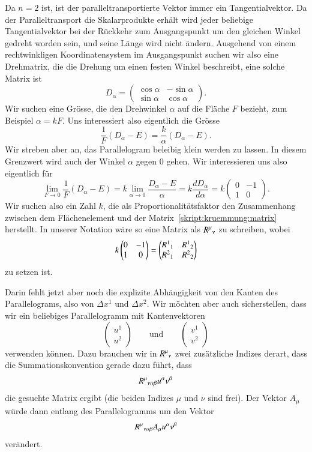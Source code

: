 Da $n=2$ ist, ist der paralleltransportierte Vektor immer ein
Tangentialvektor.
Da der Paralleltransport die Skalarprodukte erhält wird jeder beliebige
Tangentialvektor bei der Rückkehr zum Ausgangspunkt um den gleichen
Winkel gedreht worden sein, und seine Länge wird nicht ändern.
Ausgehend von einem rechtwinkligen Koordinatensystem im Ausgangspunkt
suchen wir also eine Drehmatrix, die die Drehung um einen festen Winkel
beschreibt, eine solche Matrix ist
\[
D_{\alpha}
=
\begin{pmatrix}
\cos\alpha&-\sin\alpha\\
\sin\alpha& \cos\alpha
\end{pmatrix}.
\]
Wir suchen eine Grösse, die den Drehwinkel $\alpha$ auf die
Fläche $F$ bezieht, zum Beispiel $\alpha=kF$.
Uns interessiert also eigentlich die Grösse
\[
\frac{1}{F}(D_{\alpha}-E)
=
\frac{k}{\alpha}(D_{\alpha}-E).
\]
Wir streben aber an, das Parallelogram beleibig klein werden zu lassen.
In diesem Grenzwert wird auch der Winkel $\alpha$ gegen $0$ gehen.
Wir interessieren uns also eigentlich für
\begin{equation}
\lim_{F\to 0}\frac{1}{F}(D_{\alpha}-E)
=
k \lim_{\alpha\to 0}
\frac{D_\alpha - E}{\alpha}
=
k \frac{dD_\alpha}{d\alpha}
=
k
\begin{pmatrix}
0&-1\\
1&0
\end{pmatrix}.
\label{skript:kruemmung:matrix}
\end{equation}
Wir suchen also ein Zahl $k$, die als Proportionalitätsfaktor den Zusammenhang
zwischen dem Flächenelement und der Matrix~\eqref{skript:kruemmung:matrix}
herstellt.
In unserer Notation wäre so eine Matrix als $R^\mu\mathstrut_\nu$ zu
schreiben, wobei
\[
k
\begin{pmatrix}
0&-1\\
1&0
\end{pmatrix}
=
\begin{pmatrix}
R^1\mathstrut_1&R^1\mathstrut_2\\
R^2\mathstrut_1&R^2\mathstrut_2
\end{pmatrix}
\]
zu setzen ist.

Darin fehlt jetzt aber noch die explizite Abhängigkeit von den Kanten
des Parallelograms, also von $\Delta x^1$ und $\Delta x^2$.
Wir möchten aber auch sicherstellen, dass wir ein beliebiges Parallelogramm
mit Kantenvektoren
\[
\begin{pmatrix}u^1\\u^2\end{pmatrix}
\qquad\text{und}\qquad
\begin{pmatrix}v^1\\v^2\end{pmatrix}
\]
verwenden können.
Dazu brauchen wir in $R^\mu\mathstrut_\nu$ zwei zusätzliche Indizes
derart, dass die Summationskonvention gerade dazu führt, dass
\[
R^\mu\mathstrut_{\nu\alpha\beta}u^\alpha v^\beta
\]
die gesuchte Matrix ergibt (die beiden Indizes $\mu$ und $\nu$ sind frei).
Der Vektor $A_\mu$ würde dann entlang des Parallelogramms um den
Vektor
\[
R^\mu\mathstrut_{\nu\alpha\beta} A_\mu u^\alpha v^\beta
\]
verändert.

